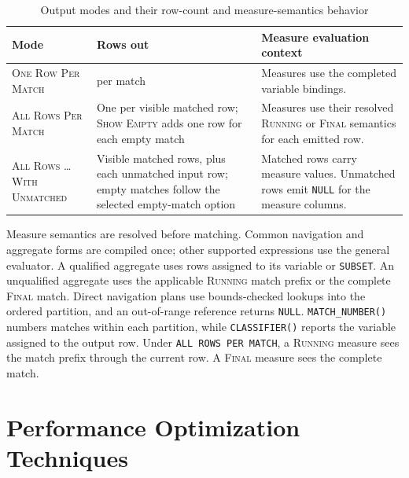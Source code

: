 \begin{table}[htbp]
  \centering
  \caption{Output modes and their row-count and measure-semantics
    behavior}
  \label{tab:rows-per-match}
  \begin{tabularx}{\textwidth}{>{\raggedright\arraybackslash}p{3.0cm}%
    >{\raggedright\arraybackslash}p{3.5cm}X}
    \toprule
    \textbf{Mode} & \textbf{Rows out} & \textbf{Measure evaluation context} \\
    \midrule
    \textsc{One Row Per Match}
      & 1 per match
      & Measures use the completed variable bindings. \\[6pt]
    \textsc{All Rows Per Match}
      & One per visible matched row; \textsc{Show Empty} adds one row
        for each empty match
      & Measures use their resolved \textsc{Running} or
        \textsc{Final} semantics for each emitted row. \\[6pt]
    \textsc{All Rows \ldots With Unmatched}
      & Visible matched rows, plus each unmatched input row; empty
        matches follow the selected empty-match option
      & Matched rows carry measure values.  Unmatched rows emit
        \texttt{NULL} for the measure columns. \\
    \bottomrule
  \end{tabularx}
\end{table}

Measure semantics are resolved before matching.  Common navigation and
aggregate forms are compiled once; other supported expressions use the
general evaluator.  A qualified aggregate uses rows assigned to its
variable or \texttt{SUBSET}.  An unqualified aggregate uses the
applicable \textsc{Running} match prefix or the complete \textsc{Final}
match.
Direct navigation plans use bounds-checked lookups into the ordered
partition, and an out-of-range reference returns \texttt{NULL}.
\texttt{MATCH\_NUMBER()} numbers matches within each partition, while
\texttt{CLASSIFIER()} reports the variable assigned to the output row.
Under \texttt{ALL ROWS PER MATCH}, a \textsc{Running} measure sees the
match prefix through the current row.  A \textsc{Final} measure sees
the complete match.

\section{Performance Optimization Techniques}
\label{sec:bg-performance}

